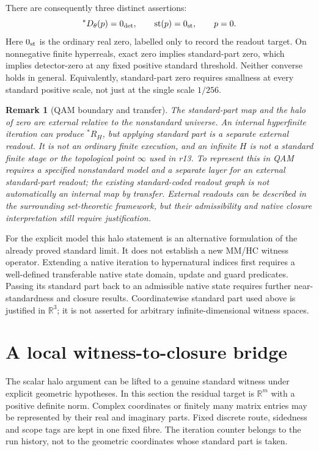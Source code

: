 \documentclass[11pt,a4paper]{article}
\newtheorem{remark}{Remark}
\begin{document}
There are consequently three distinct assertions:
\[
{}^*D_\theta(p)=0_{\rm det},\qquad
\operatorname{st}(p)=0_{\rm st},\qquad p=0.
\]
Here $0_{\rm st}$ is the ordinary real zero, labelled only to record the
readout target. On nonnegative finite hyperreals, exact zero implies
standard-part zero, which implies detector-zero at any fixed positive
standard threshold. Neither converse holds in general. Equivalently,
standard-part zero requires smallness at every standard positive scale,
not just at the single scale $1/256$.

\begin{remark}[QAM boundary and transfer]
The standard-part map and the halo of zero are external relative to the
nonstandard universe. An internal hyperfinite iteration can produce
${}^*R_H$, but applying standard part is a separate external readout.
It is not an ordinary finite execution, and an infinite $H$ is not a
standard finite stage or the topological point $\infty$ used in r13.
To represent this in QAM requires a specified nonstandard model and a
separate layer for an external standard-part readout; the existing
standard-coded readout graph is not automatically an internal map by transfer.
External readouts can be described in the surrounding set-theoretic
framework, but their admissibility and native closure interpretation still
require justification.
\end{remark}

For the explicit model this halo statement is an alternative formulation of
the already proved standard limit. It does not establish a new MM/HC witness
operator. Extending a native iteration to hypernatural indices first requires
a well-defined transferable native state domain, update and guard predicates.
Passing its standard part back to an admissible native state requires further
near-standardness and closure results. Coordinatewise standard part used
above is justified in $\mathbb R^3$; it is not asserted for arbitrary
infinite-dimensional witness spaces.

\section{A local witness-to-closure bridge}
The scalar halo argument can be lifted to a genuine standard witness under
explicit geometric hypotheses. In this section the residual target is
$\mathbb R^m$ with a positive definite norm. Complex coordinates or finitely
many matrix entries may be represented by their real and imaginary parts.
Fixed discrete route, sidedness and scope tags are kept in one fixed fibre.
The iteration counter belongs to the run history, not to the geometric
coordinates whose standard part is taken.
\end{document}
